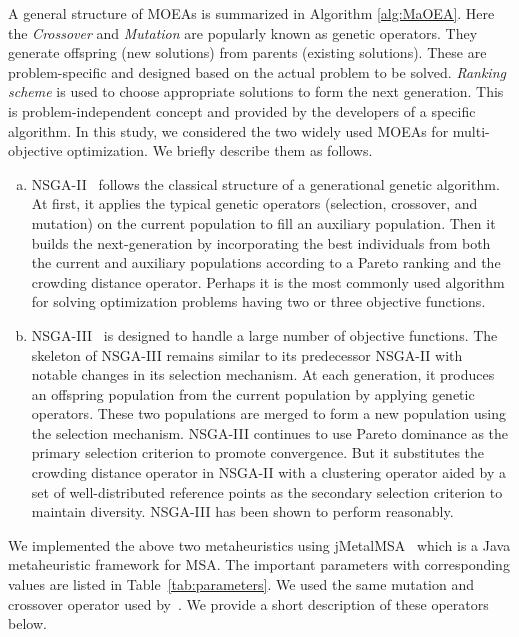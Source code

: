 A general structure of MOEAs is summarized in Algorithm \ref{alg:MaOEA}. Here the \textit{Crossover} and \textit{Mutation} are popularly known as genetic operators. They generate offspring (new solutions) from parents (existing solutions). These are problem-specific and designed based on the actual problem to be solved. \textit{Ranking scheme} is used to choose appropriate solutions to form the next generation. This is problem-independent concept and provided by the developers of a specific algorithm. In this study, we considered the two widely used MOEAs for multi-objective optimization. We briefly describe them as follows.

\begin{enumerate}[(a)]
	
	\item NSGA-II~\citep{deb2002fast} follows the classical structure of a generational genetic algorithm. At first, it applies the typical genetic operators (selection, crossover, and mutation) on the current population to fill an auxiliary population. Then it builds the next-generation by incorporating the best individuals from both the current and auxiliary populations according to a Pareto ranking and the crowding distance operator. Perhaps it is the most commonly used algorithm for solving optimization problems having two or three objective functions. 
	
	\item NSGA-III~\citep{deb2014evolutionary} is designed to handle a large number of objective functions. The skeleton of NSGA-III remains similar to its predecessor NSGA-II with notable changes in its selection mechanism. At each generation, it produces an offspring population from the current population by applying genetic operators. These two populations are merged to form a new population using the selection mechanism. NSGA-III continues to use Pareto dominance as the primary selection criterion to promote convergence. But it substitutes the crowding distance operator in NSGA-II with a clustering operator aided by a set of well-distributed reference points as the secondary selection criterion to maintain diversity. NSGA-III has been shown to perform reasonably.
\end{enumerate} 

We implemented the above two metaheuristics using jMetalMSA~\citep{zambrano2017multi} which is a Java metaheuristic framework for MSA. The important parameters with corresponding values are listed in Table~\ref{tab:parameters}. We used the same mutation and crossover operator used by~\cite{ortuno2013optimizing}. We provide a short description of these operators below. 

